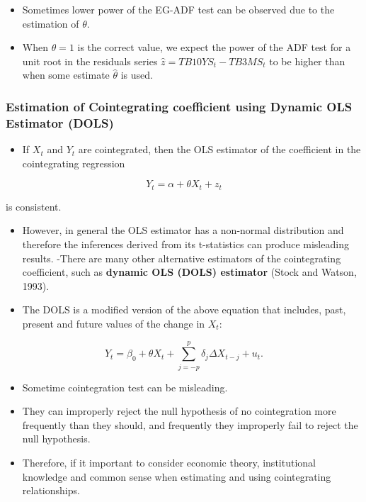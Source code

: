 \documentclass[]{book}
\providecommand{\tightlist}{%
  \setlength{\itemsep}{0pt}\setlength{\parskip}{0pt}}
\begin{document}
\begin{itemize}
\tightlist
\item
  Sometimes lower power of the EG-ADF test can be observed due to the estimation of \(\theta.\)
\item
  When \(\theta =1\) is the correct value, we expect the power of the ADF test for a unit root in the residuals series \(\hat{z}= TB10YS_t-TB3MS_t\) to be higher than when some estimate \(\hat{\theta}\) is used.
\end{itemize}

\hypertarget{estimation-of-cointegrating-coefficient-using-dynamic-ols-estimator-dols}{%
\subsubsection{Estimation of Cointegrating coefficient using Dynamic OLS Estimator (DOLS)}\label{estimation-of-cointegrating-coefficient-using-dynamic-ols-estimator-dols}}

\begin{itemize}
\tightlist
\item
  If \(X_t\) and \(Y_t\) are cointegrated, then the OLS estimator of the coefficient in the cointegrating regression
\end{itemize}

\[Y_t=\alpha +\theta X_t+z_t\]

is consistent.

\begin{itemize}
\tightlist
\item
  However, in general the OLS estimator has a non-normal distribution and therefore the inferences derived from its t-statistics can produce misleading results.
  -There are many other alternative estimators of the cointegrating coefficient, such as \textbf{dynamic OLS (DOLS) estimator} (Stock and Watson, 1993).
\item
  The DOLS is a modified version of the above equation that includes, past, present and future values of the change in \(X_t:\)
\end{itemize}

\[Y_t=\beta_0 +\theta X_t+\sum_{j=-p}^{p}\delta_j\Delta X_{t-j}+u_t.\]

\begin{itemize}
\tightlist
\item
  Sometime cointegration test can be misleading.
\item
  They can improperly reject the null hypothesis of no cointegration more frequently than they should, and frequently they improperly fail to reject the null hypothesis.
\item
  Therefore, if it important to consider economic theory, institutional knowledge and common sense when estimating and using cointegrating relationships.
\end{itemize}
\end{document}
